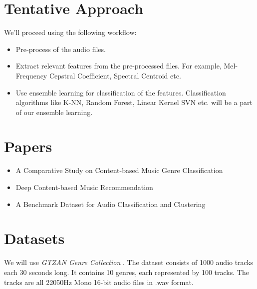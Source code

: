 \documentclass[a4paper,10pt]{article}
\begin{document}
\section{Tentative Approach}
We'll proceed using the following workflow:
\begin{itemize}
 \item Pre-process of the audio files.
 \item Extract relevant features from the pre-processed files. For example, Mel-Frequency Cepstral Coefficient, Spectral Centroid etc.
 \item Use ensemble learning for classification of the features. Classification algorithms like K-NN, Random Forest, Linear Kernel SVN etc. will be a part of our ensemble learning.
\end{itemize}


\section{Papers}
\begin{itemize}
 \item A Comparative Study on Content-based Music Genre Classification \cite{Li:2003:CSC:860435.860487}
 \item Deep Content-based Music Recommendation \cite{Oord:2013:DCM:2999792.2999907}
 \item A Benchmark Dataset for Audio Classification and Clustering \cite{HomburgEtAl_2005_ABencDataFor}
\end{itemize}

\section{Datasets}
We will use \textit{GTZAN Genre Collection} \cite{GTZAN}.
The dataset consists of 1000 audio tracks each 30 seconds long. It contains 10 genres, each represented by 100 tracks. The tracks are all 22050Hz Mono 16-bit audio files in .wav format.




\end{document}

